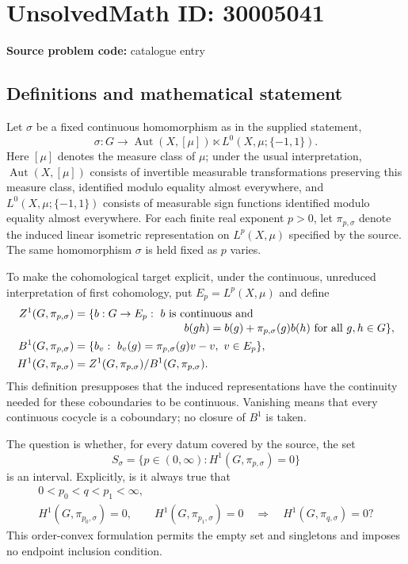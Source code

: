 \documentclass[11pt]{article}
\begin{document}
\section*{UnsolvedMath ID: 30005041}
\textbf{Source problem code:} catalogue entry
\subsection{Definitions and mathematical statement}
Let \(\sigma\) be a fixed continuous homomorphism as in the supplied statement,
\[
\sigma:G\longrightarrow \operatorname{Aut}(X,[\mu])\ltimes L^0(X,\mu;\{-1,1\}).
\]
Here \([\mu]\) denotes the measure class of \(\mu\); under the usual interpretation, \(\operatorname{Aut}(X,[\mu])\) consists of invertible measurable transformations preserving this measure class, identified modulo equality almost everywhere, and \(L^0(X,\mu;\{-1,1\})\) consists of measurable sign functions identified modulo equality almost everywhere. For each finite real exponent \(p>0\), let \(\pi_{p,\sigma}\) denote the induced linear isometric representation on \(L^p(X,\mu)\) specified by the source. The same homomorphism \(\sigma\) is held fixed as \(p\) varies.

To make the cohomological target explicit, under the continuous, unreduced interpretation of first cohomology, put \(E_p=L^p(X,\mu)\) and define
\[
\begin{aligned}
Z^1(G,\pi_{p,\sigma})
&=\{b:G\to E_p:\ b\text{ is continuous and }\\[-2pt]
&\hspace{35mm}b(gh)=b(g)+\pi_{p,\sigma}(g)b(h)\text{ for all }g,h\in G\},\\
B^1(G,\pi_{p,\sigma})
&=\{b_v:\ b_v(g)=\pi_{p,\sigma}(g)v-v,\ v\in E_p\},\\
H^1(G,\pi_{p,\sigma})
&=Z^1(G,\pi_{p,\sigma})/B^1(G,\pi_{p,\sigma}).
\end{aligned}
\]
This definition presupposes that the induced representations have the continuity needed for these coboundaries to be continuous. Vanishing means that every continuous cocycle is a coboundary; no closure of \(B^1\) is taken.

The question is whether, for every datum covered by the source, the set
\[
S_\sigma=\{p\in(0,\infty):H^1(G,\pi_{p,\sigma})=0\}
\]
is an interval. Explicitly, is it always true that
\[
\begin{gathered}
0<p_0<q<p_1<\infty,\\
H^1(G,\pi_{p_0,\sigma})=0,
\qquad H^1(G,\pi_{p_1,\sigma})=0
\quad\Longrightarrow\quad
H^1(G,\pi_{q,\sigma})=0?
\end{gathered}
\]
This order-convex formulation permits the empty set and singletons and imposes no endpoint inclusion condition.
\end{document}
